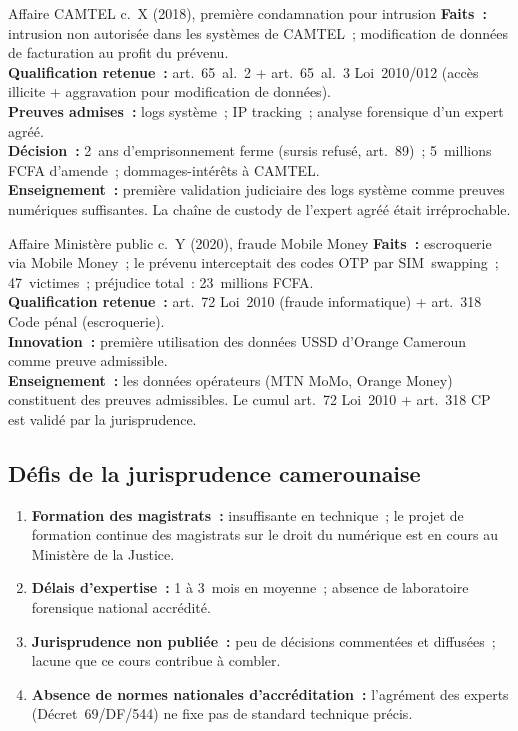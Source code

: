 \begin{boxscenario}{Affaire CAMTEL c.~X (2018), première condamnation pour intrusion}
\textbf{Faits~:} intrusion non autorisée dans les systèmes de CAMTEL~;
modification de données de facturation au profit du prévenu.\\
\textbf{Qualification retenue~:} art.~65~al.~2 + art.~65~al.~3
Loi~2010/012 (accès illicite + aggravation pour modification de données).\\
\textbf{Preuves admises~:} logs système~; IP tracking~; analyse forensique
d'un expert agréé.\\
\textbf{Décision~:} 2~ans d'emprisonnement ferme (sursis refusé, art.~89)~;
5~millions FCFA d'amende~; dommages-intérêts à CAMTEL.\\
\textbf{Enseignement~:} première validation judiciaire des logs système
comme preuves numériques suffisantes. La chaîne de custody de l'expert
agréé était irréprochable.
\end{boxscenario}

\begin{boxscenario}{Affaire Ministère public c.~Y (2020), fraude Mobile Money}
\textbf{Faits~:} escroquerie via Mobile Money~; le prévenu interceptait
des codes OTP par SIM~swapping~; 47~victimes~; préjudice total~:
23~millions FCFA.\\
\textbf{Qualification retenue~:} art.~72 Loi~2010 (fraude informatique)
+ art.~318 Code pénal (escroquerie).\\
\textbf{Innovation~:} première utilisation des données USSD d'Orange
Cameroun comme preuve admissible.\\
\textbf{Enseignement~:} les données opérateurs (MTN MoMo, Orange Money)
constituent des preuves admissibles. Le cumul art.~72 Loi~2010 + art.~318
CP est validé par la jurisprudence.
\end{boxscenario}

\subsection{Défis de la jurisprudence camerounaise}

\begin{enumerate}
    \item \textbf{Formation des magistrats~:} insuffisante en technique~;
          le projet de formation continue des magistrats sur le droit du
          numérique est en cours au Ministère de la Justice.
    \item \textbf{Délais d'expertise~:} 1 à 3~mois en moyenne~;
          absence de laboratoire forensique national accrédité.
    \item \textbf{Jurisprudence non publiée~:} peu de décisions commentées
          et diffusées~; lacune que ce cours contribue à combler.
    \item \textbf{Absence de normes nationales d'accréditation~:}
          l'agrément des experts (Décret~69/DF/544) ne fixe pas de
          standard technique précis.
\end{enumerate}

